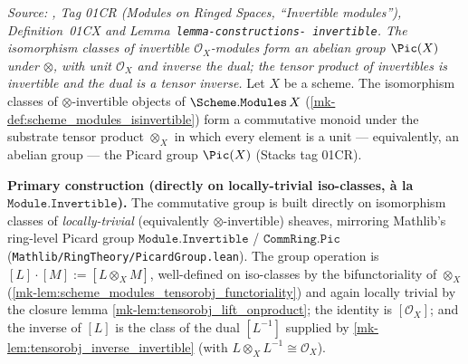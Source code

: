 \begin{lemma}
  \label{mk-lem:tensorobj_isoclass_commgroup}

  \textit{Source: \cite{stacks-project}, Tag 01CR (Modules on Ringed Spaces,
  ``Invertible modules''), Definition~01CX and Lemma~\texttt{lemma-constructions-%
  invertible}. The isomorphism classes of invertible \(\mathcal{O}_X\)-modules
  form an abelian group \(\Pic(X)\) under \(\otimes\), with unit
  \(\mathcal{O}_X\) and inverse the dual; the tensor product of invertibles is
  invertible and the dual is a tensor inverse.}
  Let \(X\) be a scheme. The isomorphism classes of \(\otimes\)-invertible
  objects of \(\Scheme.\mathtt{Modules}\,X\)
  (\ref{mk-def:scheme_modules_isinvertible}) form a commutative monoid under the
  substrate tensor product \(\otimes_X\) in which every element is a unit ---
  equivalently, an abelian group --- the Picard group \(\Pic(X)\) (Stacks tag
  01CR).

  \textbf{Primary construction (directly on locally-trivial iso-classes, à la
  \(\mathtt{Module.Invertible}\)).} The commutative group is built directly on
  isomorphism classes of \emph{locally-trivial} (equivalently \(\otimes\)-invertible)
  sheaves, mirroring Mathlib's ring-level Picard group
  \(\mathtt{Module.Invertible}\) / \(\mathtt{CommRing.Pic}\)
  (\texttt{Mathlib/RingTheory/PicardGroup.lean}). The group operation is
  \([L]\cdot[M] := [L \otimes_X M]\), well-defined on iso-classes by the
  bifunctoriality of \(\otimes_X\)
  (\ref{mk-lem:scheme_modules_tensorobj_functoriality}) and again locally trivial by
  the closure lemma \ref{mk-lem:tensorobj_lift_onproduct}; the identity is
  \([\mathcal{O}_X]\); and the inverse of \([L]\) is the class of the dual
  \([L^{-1}]\) supplied by \ref{mk-lem:tensorobj_inverse_invertible} (with
  \(L \otimes_X L^{-1} \cong \mathcal{O}_X\)).


\end{lemma}
